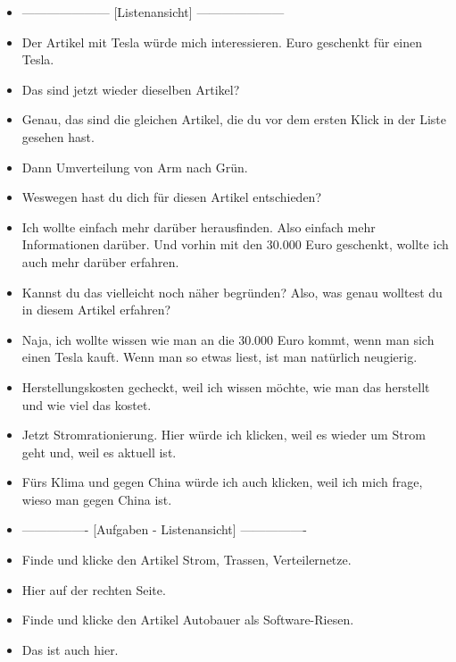{\begin{itemize}[]
        \item {---------------------} [Listenansicht] {---------------------}
        \item {} Der Artikel mit Tesla würde mich interessieren.  Euro geschenkt für einen Tesla\frqq{}.
        \item {} Das sind jetzt wieder dieselben Artikel?
        \item {} Genau, das sind die gleichen Artikel, die du vor dem ersten Klick in der Liste gesehen hast.
        \item {} Dann \flqq Umverteilung von Arm nach Grün\frqq{}.
        \item {} Weswegen hast du dich für diesen Artikel entschieden?
        \item {} Ich wollte einfach mehr darüber herausfinden.
              Also einfach mehr Informationen darüber.
              Und vorhin mit den 30.000 Euro geschenkt, wollte ich auch mehr darüber erfahren.
        \item {} Kannst du das vielleicht noch näher begründen?
              Also, was genau wolltest du in diesem Artikel erfahren?
        \item {} Naja, ich wollte wissen wie man an die 30.000 Euro kommt, wenn man sich einen Tesla kauft.
              Wenn man so etwas liest, ist man natürlich neugierig.
        \item {} \flqq Herstellungskosten gecheckt\frqq{}, weil ich wissen möchte, wie man das herstellt und wie viel das kostet.
        \item {} Jetzt \flqq Stromrationierung\frqq{}. Hier würde ich klicken, weil es wieder um Strom geht und, weil es aktuell ist.
        \item {} \flqq Fürs Klima und gegen China\frqq{} würde ich auch klicken, weil ich mich frage, wieso man gegen China ist.
        \item {----------------} [Aufgaben - Listenansicht] {----------------}
        \item {} Finde und klicke den Artikel \flqq Strom, Trassen, Verteilernetze\frqq{}.
        \item {} Hier auf der rechten Seite.
        \item {} Finde und klicke den Artikel \flqq Autobauer als Software-Riesen\frqq{}.
        \item {} Das ist auch hier.

\end{itemize}}
